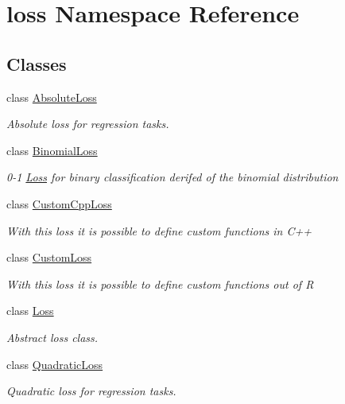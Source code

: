 \hypertarget{namespaceloss}{}\section{loss Namespace Reference}
\label{namespaceloss}
\subsection*{Classes}
\begin{DoxyCompactItemize}
\item 
class \mbox{\hyperlink{classloss_1_1_absolute_loss}{Absolute\+Loss}}
\begin{DoxyCompactList}\small\item\em Absolute loss for regression tasks. \end{DoxyCompactList}\item 
class \mbox{\hyperlink{classloss_1_1_binomial_loss}{Binomial\+Loss}}
\begin{DoxyCompactList}\small\item\em 0-\/1 \mbox{\hyperlink{classloss_1_1_loss}{Loss}} for binary classification derifed of the binomial distribution \end{DoxyCompactList}\item 
class \mbox{\hyperlink{classloss_1_1_custom_cpp_loss}{Custom\+Cpp\+Loss}}
\begin{DoxyCompactList}\small\item\em With this loss it is possible to define custom functions in {\ttfamily C++} \end{DoxyCompactList}\item 
class \mbox{\hyperlink{classloss_1_1_custom_loss}{Custom\+Loss}}
\begin{DoxyCompactList}\small\item\em With this loss it is possible to define custom functions out of {\ttfamily R} \end{DoxyCompactList}\item 
class \mbox{\hyperlink{classloss_1_1_loss}{Loss}}
\begin{DoxyCompactList}\small\item\em Abstract loss class. \end{DoxyCompactList}\item 
class \mbox{\hyperlink{classloss_1_1_quadratic_loss}{Quadratic\+Loss}}
\begin{DoxyCompactList}\small\item\em Quadratic loss for regression tasks. \end{DoxyCompactList}\end{DoxyCompactItemize}
